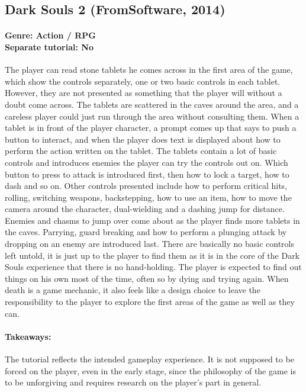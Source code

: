 \subsection{Dark Souls 2 (FromSoftware, 2014)}
\paragraph{Genre: Action / RPG \\ Separate tutorial: No \\}
The player can read stone tablets he comes across in the first area of the game, which show the controls separately, one or two basic controls in each tablet. However, they are not presented as something that the player will without a doubt come across. The tablets are scattered in the caves around the area, and a careless player could just run through the area without consulting them. When a tablet is in front of the player character, a prompt comes up that says to push a button to interact, and when the player does text is displayed about how to perform the action written on the tablet. The tablets contain a lot of basic controls and introduces enemies the player can try the controls out on. Which button to press to attack is introduced first, then how to lock a target, how to dash and so on. Other controls presented include how to perform critical hits, rolling, switching weapons, backstepping, how to use an item, how to move the camera around the character, dual-wielding and a dashing jump for distance. Enemies and chasms to jump over come about as the player finds more tablets in the caves. Parrying, guard breaking and how to perform a plunging attack by dropping on an enemy are introduced last. There are basically no basic controls left untold, it is just up to the player to find them as it is in the core of the Dark Souls experience that there is no hand-holding. The player is expected to find out things on his own most of the time, often so by dying and trying again. When death is a game mechanic, it also feels like a design choice to leave the responsibility to the player to explore the first areas of the game as well as they can.
\paragraph{Takeaways:}
The tutorial reflects the intended gameplay experience. It is not supposed to be forced on the player, even in the early stage, since the philosophy of the game is to be unforgiving and requires research on the player's part in general. 

